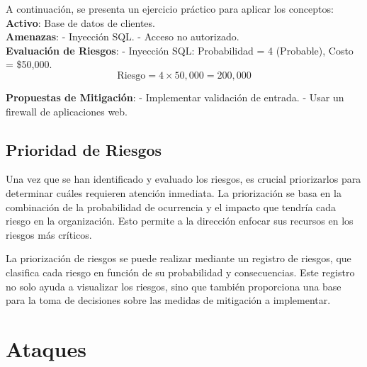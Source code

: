 A continuación, se presenta un ejercicio práctico para aplicar los conceptos: 
\textbf{Activo}: Base de datos de clientes.\\
\textbf{Amenazas}: 
- Inyección SQL.
- Acceso no autorizado.\\
\textbf{Evaluación de Riesgos}:
- Inyección SQL: Probabilidad = 4 (Probable), Costo = \$50,000.\\
\[
\text{Riesgo} = 4 \times 50,000 = 200,000
\]

\textbf{Propuestas de Mitigación}:
- Implementar validación de entrada.
- Usar un firewall de aplicaciones web.


\subsection{Prioridad de Riesgos}
Una vez que se han identificado y evaluado los riesgos, es crucial priorizarlos para determinar cuáles requieren atención inmediata. La priorización se basa en la combinación de la probabilidad de ocurrencia y el impacto que tendría cada riesgo en la organización. Esto permite a la dirección enfocar sus recursos en los riesgos más críticos.

La priorización de riesgos se puede realizar mediante un registro de riesgos, que clasifica cada riesgo en función de su probabilidad y consecuencias. Este registro no solo ayuda a visualizar los riesgos, sino que también proporciona una base para la toma de decisiones sobre las medidas de mitigación a implementar.




\section{Ataques}

